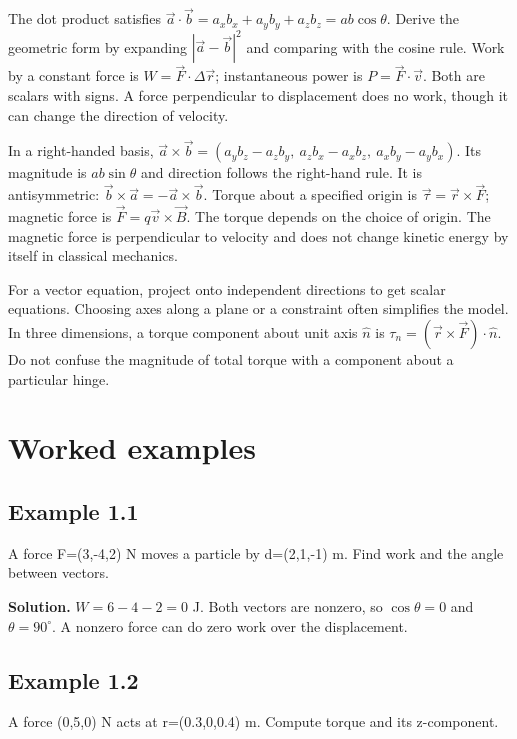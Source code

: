 \documentclass[11pt,a4paper,openany]{book}
\begin{document}
The dot product satisfies $\vec a\cdot\vec b=a_xb_x+a_yb_y+a_zb_z=ab\cos\theta$. Derive the geometric form by expanding $|\vec a-\vec b|^2$ and comparing with the cosine rule. Work by a constant force is $W=\vec F\cdot\Delta\vec r$; instantaneous power is $P=\vec F\cdot\vec v$. Both are scalars with signs. A force perpendicular to displacement does no work, though it can change the direction of velocity.

In a right-handed basis, $\vec a\times\vec b=(a_yb_z-a_zb_y,\ a_zb_x-a_xb_z,\ a_xb_y-a_yb_x)$. Its magnitude is $ab\sin\theta$ and direction follows the right-hand rule. It is antisymmetric: $\vec b\times\vec a=-\vec a\times\vec b$. Torque about a specified origin is $\vec\tau=\vec r\times\vec F$; magnetic force is $\vec F=q\vec v\times\vec B$. The torque depends on the choice of origin. The magnetic force is perpendicular to velocity and does not change kinetic energy by itself in classical mechanics.

For a vector equation, project onto independent directions to get scalar equations. Choosing axes along a plane or a constraint often simplifies the model. In three dimensions, a torque component about unit axis $\hat n$ is $\tau_n=(\vec r\times\vec F)\cdot\hat n$. Do not confuse the magnitude of total torque with a component about a particular hinge.
\begin{center}
\end{center}
\section{Worked examples}
\subsection*{Example 1.1}
A force F=(3,-4,2) N moves a particle by d=(2,1,-1) m. Find work and the angle between vectors.

\textbf{Solution.} $W=6-4-2=0$ J. Both vectors are nonzero, so $\cos\theta=0$ and $\theta=90^\circ$. A nonzero force can do zero work over the displacement.
\subsection*{Example 1.2}
A force (0,5,0) N acts at r=(0.3,0,0.4) m. Compute torque and its z-component.
\end{document}
